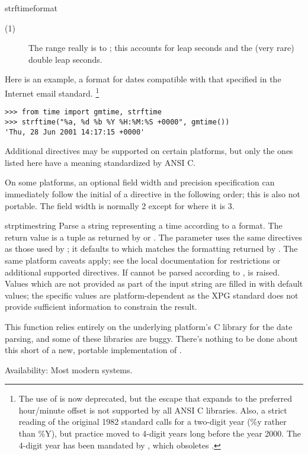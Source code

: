 \begin{funcdesc}{strftime}{format}
\begin{description}
  \item[(1)]
    The range really is  to ; this accounts for leap
    seconds and the (very rare) double leap seconds.
\end{description}

Here is an example, a format for dates compatible with that specified 
in the  Internet email standard.
	\footnote{The use of  is now
	deprecated, but the  escape that expands to the preferred 
	hour/minute offset is not supported by all ANSI C libraries. Also,
	a strict reading of the original 1982  standard calls for
	a two-digit year (\%y rather than \%Y), but practice moved to
	4-digit years long before the year 2000.  The 4-digit year has
        been mandated by , which obsoletes .}

\begin{verbatim}
>>> from time import gmtime, strftime
>>> strftime("%a, %d %b %Y %H:%M:%S +0000", gmtime())
'Thu, 28 Jun 2001 14:17:15 +0000'
\end{verbatim}

Additional directives may be supported on certain platforms, but
only the ones listed here have a meaning standardized by ANSI C.

On some platforms, an optional field width and precision
specification can immediately follow the initial \character{\%} of a
directive in the following order; this is also not portable.
The field width is normally 2 except for  where it is 3.
\end{funcdesc}

\begin{funcdesc}{strptime}{string}
Parse a string representing a time according to a format.  The return 
value is a tuple as returned by  or
.  The  parameter uses the same
directives as those used by ; it defaults to
 which matches the formatting
returned by .  The same platform caveats apply; see
the local \UNIX{} documentation for restrictions or additional
supported directives.  If  cannot be parsed according to
,  is raised.  Values which are not
provided as part of the input string are filled in with default
values; the specific values are platform-dependent as the XPG standard
does not provide sufficient information to constrain the result.

 This function relies entirely on the underlying
platform's C library for the date parsing, and some of these libraries
are buggy.  There's nothing to be done about this short of a new,
portable implementation of .

Availability: Most modern \UNIX{} systems.
\end{funcdesc}

